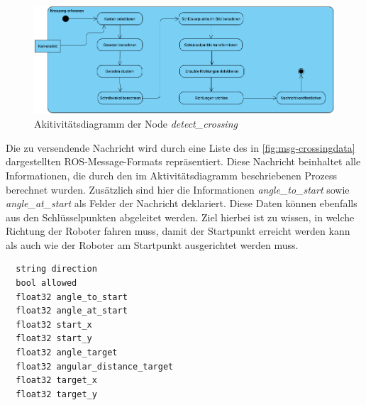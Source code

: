 \begin{figure}[h!]
  \centering
  \includegraphics[width=\linewidth]{images/DetectCrossing_activity.PNG}
  \caption{Akitivitätsdiagramm der Node \textit{detect\_crossing}}
  \label{fig:DetectCrossing_Activity}
\end{figure}

Die zu versendende Nachricht wird durch eine Liste des in \ref{fig:msg-crossingdata} dargestellten ROS-Message-Formats repräsentiert. Diese Nachricht beinhaltet alle Informationen,
die durch den im Aktivitätsdiagramm beschriebenen Prozess berechnet wurden. Zusätzlich sind hier die Informationen \textit{angle\_to\_start} sowie \textit{angle\_at\_start} als Felder
der Nachricht deklariert. Diese Daten können ebenfalls aus den Schlüsselpunkten abgeleitet werden. Ziel hierbei ist zu wissen, in welche Richtung der Roboter fahren muss, damit 
der Startpunkt erreicht werden kann als auch wie der Roboter am Startpunkt ausgerichtet werden muss. 

\begin{code}
  \begin{verbatim}
  string direction
  bool allowed
  float32 angle_to_start
  float32 angle_at_start
  float32 start_x
  float32 start_y
  float32 angle_target
  float32 angular_distance_target
  float32 target_x
  float32 target_y
  \end{verbatim}
  \caption{Message-Format für die Kreuzungsdetektion \textit{CrossingData}}
  \label{fig:msg-crossingdata}
\end{code}


